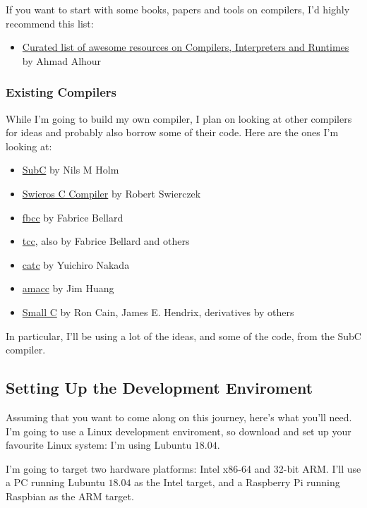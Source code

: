 \documentclass[a4paper,12pt]{article}
\begin{document}
If you want to start with some books, papers and tools on compilers, I'd highly recommend this list:

\begin{itemize}
    \item \href{https://github.com/aalhour/awesome-compilers}{Curated list of awesome resources on Compilers, Interpreters and Runtimes} by Ahmad Alhour
\end{itemize}

\subsubsection{Existing Compilers}

While I'm going to build my own compiler, I plan on looking at other compilers for ideas and probably also borrow some of their code. Here are the ones I'm looking at:

\begin{itemize}
    \item \href{http://www.t3x.org/subc/}{SubC} by Nils M Holm
    \item \href{https://github.com/rswier/swieros/blob/master/root/bin/c.c}{Swieros C Compiler} by Robert Swierczek
    \item \href{https://github.com/DoctorWkt/fbcc}{fbcc} by Fabrice Bellard
    \item \href{https://bellard.org/tcc}{tcc}, also by Fabrice Bellard and others
    \item \href{https://github.com/yui0/catc}{catc}  by Yuichiro Nakada
    \item \href{https://github.com/jserv/amacc}{amacc} by Jim Huang
    \item \href{https://en.wikipedia.org/wiki/Small-C}{Small C} by Ron Cain, James E. Hendrix, derivatives by others
\end{itemize}

In particular, I'll be using a lot of the ideas, and some of the code, from the SubC compiler.

\subsection{Setting Up the Development Enviroment}

Assuming that you want to come along on this journey, here's what you'll need. I'm going to use a Linux development enviroment, so download and set up your favourite Linux system: I'm using Lubuntu $18.04$.

I'm going to target two hardware platforms: Intel x86-64 and 32-bit ARM. I'll use a PC running Lubuntu $18.04$ as the Intel target, and a Raspberry Pi running Raspbian as the ARM target.
\end{document}
